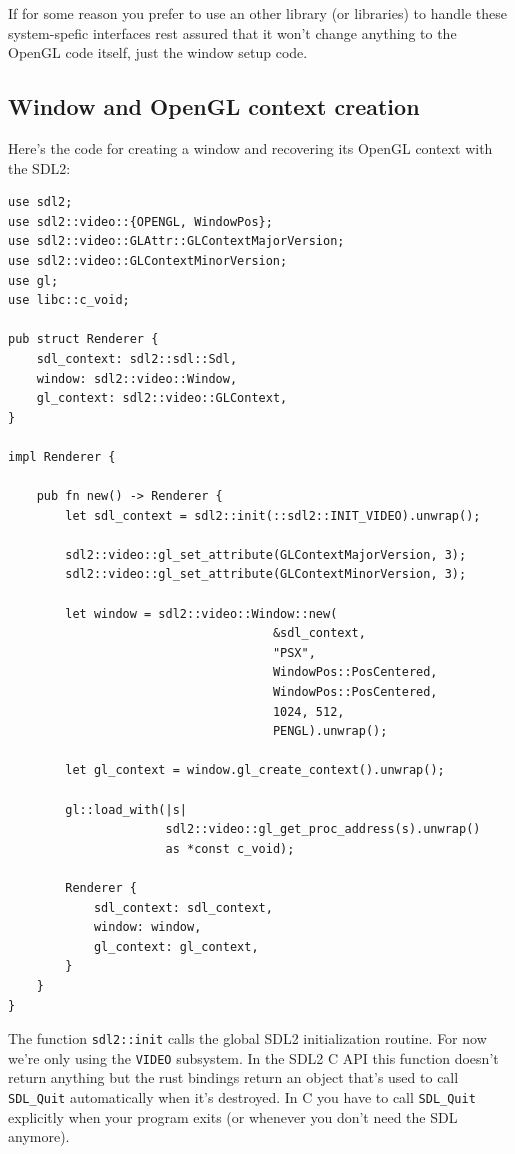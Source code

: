 \documentclass[a4paper]{article}
\newcommand{\code}[1] {\texttt{#1}}
\begin{document}
If for some reason you prefer to use an other library (or libraries)
to handle these system-spefic interfaces rest assured that it won't
change anything to the OpenGL code itself, just the window setup code.

\subsection{Window and OpenGL context creation}

Here's the code for creating a window and recovering its OpenGL
context with the SDL2:

\begin{lstlisting}
use sdl2;
use sdl2::video::{OPENGL, WindowPos};
use sdl2::video::GLAttr::GLContextMajorVersion;
use sdl2::video::GLContextMinorVersion;
use gl;
use libc::c_void;

pub struct Renderer {
    sdl_context: sdl2::sdl::Sdl,
    window: sdl2::video::Window,
    gl_context: sdl2::video::GLContext,
}

impl Renderer {

    pub fn new() -> Renderer {
        let sdl_context = sdl2::init(::sdl2::INIT_VIDEO).unwrap();

        sdl2::video::gl_set_attribute(GLContextMajorVersion, 3);
        sdl2::video::gl_set_attribute(GLContextMinorVersion, 3);

        let window = sdl2::video::Window::new(
                                     &sdl_context,
                                     "PSX",
                                     WindowPos::PosCentered,
                                     WindowPos::PosCentered,
                                     1024, 512,
                                     PENGL).unwrap();

        let gl_context = window.gl_create_context().unwrap();

        gl::load_with(|s|
                      sdl2::video::gl_get_proc_address(s).unwrap()
                      as *const c_void);

        Renderer {
            sdl_context: sdl_context,
            window: window,
            gl_context: gl_context,
        }
    }
}
\end{lstlisting}

The function \code{sdl2::init} calls the global SDL2 initialization
routine. For now we're only using the \code{VIDEO} subsystem. In the
SDL2 C API this function doesn't return anything but the rust bindings
return an object that's used to call \code{SDL\_Quit} automatically
when it's destroyed. In C you have to call \code{SDL\_Quit} explicitly
when your program exits (or whenever you don't need the SDL anymore).
\end{document}

